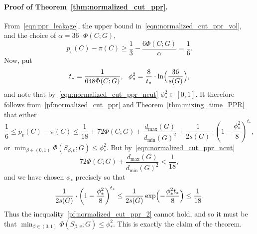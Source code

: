 \paragraph{Proof of Theorem~\ref{thm:normalized_cut_ppr}.}
	From~\eqref{eqn:ppr_leakage}, the upper bound in~\eqref{eqn:normalized_cut_ppr_vol}, and the choice of $\alpha = 36 \cdot \Phi(C;G)$, 
	\begin{equation}
	\label{pf:normalized_cut_ppr}
	p_v(C) - \pi(C) \geq \frac{1}{3} - \frac{6 \Phi(C;G)}{\alpha} = \frac{1}{6}.
	\end{equation}
	Now, put 
	\begin{equation*}
	t_{\ast} = \frac{1}{648 \Phi(C;G)},~~\phi_{\ast}^2 = \frac{8}{t_{\ast}} \cdot \ln\Bigl(\frac{36}{s(G)}\Bigr),
	\end{equation*}
	and note that by~\eqref{eqn:normalized_cut_ppr_ncut} $\phi_{\ast}^2 \in [0,1]$. It therefore follows from~\eqref{pf:normalized_cut_ppr} and Theorem~\ref{thm:mixing_time_PPR} that either
	\begin{equation}
	\label{pf:normalized_cut_ppr_2}
	\frac{1}{6} \leq p_v(C) - \pi(C) \leq \frac{1}{18} + 72 \Phi(C;G) + \frac{d_{\max}(G)}{d_{\min}(G)^2} + \frac{1}{2s(G)} \cdot \left(1 - \frac{\phi_{\ast}^2}{8}\right)^{t_{\ast}},
	\end{equation}
	or $\min_{\beta \in (0,1)} \Phi(S_{\beta,v};G) \leq \phi_{\ast}^2$. But by~\eqref{eqn:normalized_cut_ppr_ncut}
	\begin{equation*}
	72 \Phi(C;G) + \frac{d_{\max}(G)}{d_{\min}(G)^2} < \frac{1}{18},
	\end{equation*}
	and we have chosen $\phi_{\ast}$ precisely so that
	\begin{equation*}
	\frac{1}{2s(G)} \cdot \left(1 - \frac{\phi_{\ast}^2}{8}\right)^{t_{\ast}} \leq \frac{1}{2s(G)} \exp\Bigl(-\frac{\phi_{\ast}^2 t_{\ast}}{8}\Bigr) \leq \frac{1}{18}.
	\end{equation*}
	Thus the inequality~\eqref{pf:normalized_cut_ppr_2} cannot hold, and so it must be that $\min_{\beta \in (0,1)} \Phi(S_{\beta,v};G) \leq \phi_{\ast}^2$. This is exactly the claim of the theorem.

